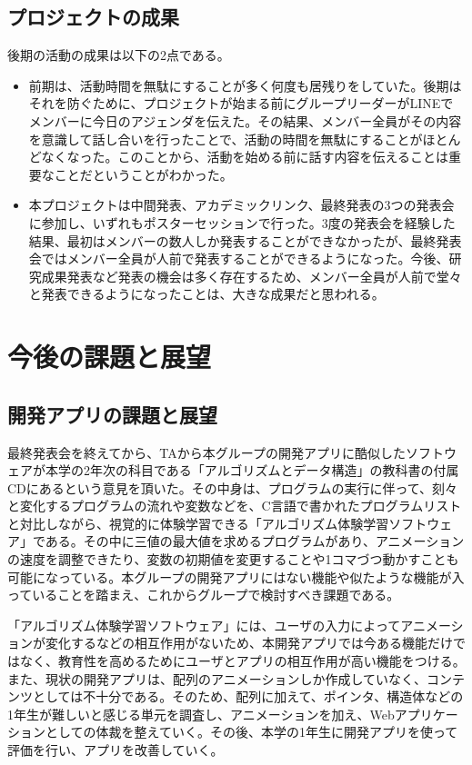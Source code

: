 \documentclass[openany,11pt,papersize]{jsbook}
\begin{document}
\section{プロジェクトの成果}
\par 後期の活動の成果は以下の2点である。
\begin{itemize}
\item 前期は、活動時間を無駄にすることが多く何度も居残りをしていた。後期はそれを防ぐために、プロジェクトが始まる前にグループリーダーがLINEでメンバーに今日のアジェンダを伝えた。その結果、メンバー全員がその内容を意識して話し合いを行ったことで、活動の時間を無駄にすることがほとんどなくなった。このことから、活動を始める前に話す内容を伝えることは重要なことだということがわかった。
\item 
本プロジェクトは中間発表、アカデミックリンク、最終発表の3つの発表会に参加し、いずれもポスターセッションで行った。3度の発表会を経験した結果、最初はメンバーの数人しか発表することができなかったが、最終発表会ではメンバー全員が人前で発表することができるようになった。今後、研究成果発表など発表の機会は多く存在するため、メンバー全員が人前で堂々と発表できるようになったことは、大きな成果だと思われる。
\end{itemize}



\chapter{今後の課題と展望}
\section{開発アプリの課題と展望}
最終発表会を終えてから、TAから本グループの開発アプリに酷似したソフトウェアが本学の2年次の科目である「アルゴリズムとデータ構造」の教科書の付属CDにあるという意見を頂いた。その中身は、プログラムの実行に伴って、刻々と変化するプログラムの流れや変数などを、C言語で書かれたプログラムリストと対比しながら、視覚的に体験学習できる「アルゴリズム体験学習ソフトウェア」である。その中に三値の最大値を求めるプログラムがあり、アニメーションの速度を調整できたり、変数の初期値を変更することや1コマづつ動かすことも可能になっている。本グループの開発アプリにはない機能や似たような機能が入っていることを踏まえ、これからグループで検討すべき課題である。

\par
「アルゴリズム体験学習ソフトウェア」には、ユーザの入力によってアニメーションが変化するなどの相互作用がないため、本開発アプリでは今ある機能だけではなく、教育性を高めるためにユーザとアプリの相互作用が高い機能をつける。また、現状の開発アプリは、配列のアニメーションしか作成していなく、コンテンツとしては不十分である。そのため、配列に加えて、ポインタ、構造体などの1年生が難しいと感じる単元を調査し、アニメーションを加え、Webアプリケーションとしての体裁を整えていく。その後、本学の1年生に開発アプリを使って評価を行い、アプリを改善していく。
\end{document}
